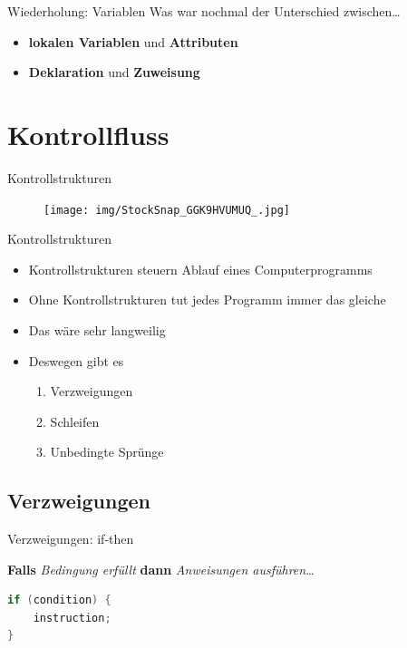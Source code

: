 \documentclass[18pt]{beamer}
\begin{document}
\begin{frame}{Wiederholung: Variablen}
    Was war nochmal der Unterschied zwischen\dots
    \vspace{.2in}
    \begin{itemize}
        \item \textbf{lokalen Variablen} und \textbf{Attributen}
        \pause
        \item \textbf{Deklaration} und \textbf{Zuweisung}
    \end{itemize}
\end{frame}

\section{Kontrollfluss}

\begin{frame}{Kontrollstrukturen}
    \begin{figure}
        \texttt{[image: img/StockSnap\_GGK9HVUMUQ\_.jpg]}
    \end{figure}
\end{frame}


\begin{frame}{Kontrollstrukturen}
    \begin{itemize}
        \item Kontrollstrukturen steuern Ablauf eines Computerprogramms
        \pause
        \item Ohne Kontrollstrukturen tut jedes Programm immer das gleiche
        \pause
        \item Das wäre sehr langweilig
        \pause
        \item Deswegen gibt es
        \begin{enumerate}
            \item Verzweigungen
            \item Schleifen
            \item Unbedingte Sprünge
        \end{enumerate}
    \end{itemize}
\end{frame}

\subsection{Verzweigungen}

\begin{frame}[fragile]{Verzweigungen: if-then}
    \begin{block}{}
        \textbf{Falls} \textit{Bedingung erfüllt} \textbf{dann} \textit{Anweisungen ausführen}\dots
    \end{block}
    \pause

    \begin{block}{}
        \begin{lstlisting}[language=Java]
if (condition) {
    instruction;
}
        \end{lstlisting}
    \end{block}
\end{frame}
\end{document}
